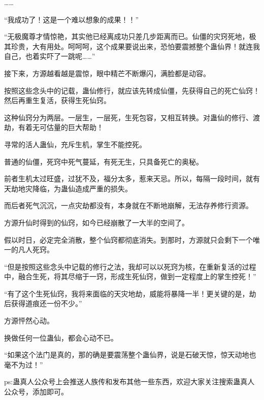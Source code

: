 \begin{this_body}
……

“我成功了！这是一个难以想象的成果！！”

“无极魔尊才情惊艳，其实他已经离成功只差几步距离而已。仙僵的灾窍死地，极其珍贵，大有用处。呵呵呵，这个成果要说出来，恐怕要震撼整个蛊仙界！就连我自己，也着实吓了一跳呢……”

接下来，方源越看越是震惊，眼中精芒不断爆闪，满脸都是动容。

按照这些念头中的记载，蛊仙修行，就应该先转成仙僵，先获得自己的死亡仙窍！然后再重生复活，获得生死仙窍。

这种仙窍分为两层。一层生，一层死，生死包容，又相互转换。对蛊仙的修行、渡劫，有着无可估量的巨大帮助！

寻常的活人蛊仙，充斥生机，掌生不能控死。

普通的仙僵，死窍中死气蔓延，有死无生，只具备死亡的奥秘。

前者生机太过旺盛，过犹不及，福分太多，惹来天忌。所以，每隔一段时间，就有天劫地灾降临，为蛊仙造成严重的损失。

而后者死气沉沉，一点灾劫都没有，本身就在不断地崩解，无法存养修行资源。

方源升仙时得到的仙窍，如今已经崩散了一大半的空间了。

假以时日，必定完全消散，整个仙窍都彻底消失。到那时，方源就只会剩下一个唯一的凡人死窍。

“但是按照这些念头中记载的修行之法，我却可以以死窍为核，在重新复活的过程中，融合生死，将其尽缩于一窍，形成生死仙窍，做到一定程度上的掌生控死！”

“有了这个生死仙窍，我将来面临的天灾地劫，威能将暴降一半！更关键的是，劫后获得道痕还一份不少。”

方源怦然心动。

换做任何一位蛊仙，都会心动不已。

“如果这个法门是真的，那的确是要震荡整个蛊仙界，说是石破天惊，惊天动地也毫不为过！”

ps:蛊真人公众号上会推送人族传和发布其他一些东西，欢迎大家关注搜索蛊真人公众号，添加即可。

\end{this_body}


